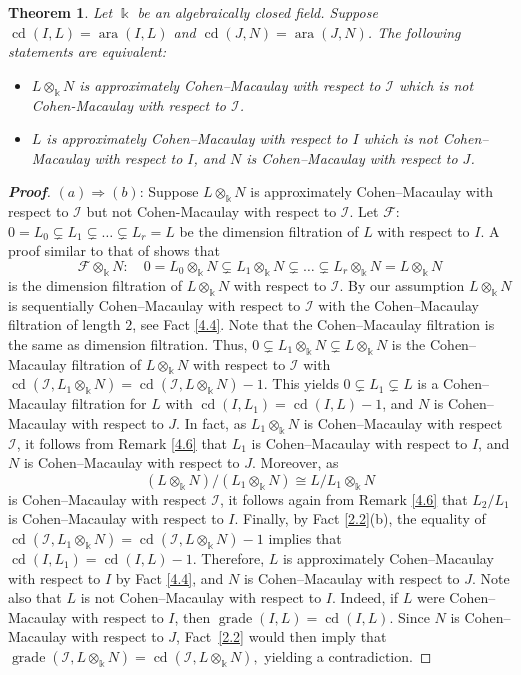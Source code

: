 \documentclass[10pt,a4paper]{amsart}
\newtheorem{theorem}{Theorem}[section]
\numberwithin{equation}{theorem}
\theoremstyle{definition}
\theoremstyle{fact}
\theoremstyle{conjecture}
\newcommand{\grade}{\operatorname{grade}}
\newcommand{\ara}{\operatorname{ara}}
\newcommand{\cd}{\operatorname{cd}}
\newenvironment{prf}[1][Proof]{\begin{proof}[\bf #1]}{\end{proof}}
\begin{document}
\begin{theorem}
\label{4.7}
Let $\Bbbk$ be an algebraically closed field. Suppose $\cd(I, L)=\ara(I, L)$ and $\cd(J, N)=\ara(J, N)$.
 The following statements are equivalent:
\begin{itemize}
\item[(a)] $L \otimes_\Bbbk N$ is approximately Cohen--Macaulay with respect to $\mathcal{I}$ which is not Cohen-Macaulay with respect to $\mathcal{I}$.
\item[(b)] $L$ is approximately Cohen--Macaulay with respect to $I$ which is not Cohen--Macaulay with respect to $I$, and $N$ is Cohen--Macaulay with respect to $J$.
\end{itemize}
\end{theorem}
\begin{prf}
\((a) \Rightarrow (b)\): Suppose $L\otimes_\Bbbk N$ is approximately Cohen--Macaulay with respect to $\mathcal{I}$ but not Cohen-Macaulay with respect to $\mathcal{I}$.
 Let  $\mathscr{F}$: $0=L_0\varsubsetneq L_1 \varsubsetneq \dots  \varsubsetneq L_r=L$
 be the dimension filtration of $L$ with respect to $I$. A proof similar to that of \cite[Lemma 4.5]{R4} shows that
\[
\mathscr{F}\otimes_{\Bbbk}N:\quad
0=L_0\otimes_{\Bbbk}N
\varsubsetneq L_1\otimes_{\Bbbk}N
\varsubsetneq \dots
\varsubsetneq L_r\otimes_{\Bbbk}N
=L\otimes_{\Bbbk}N
\]
is the dimension filtration of \(L\otimes_{\Bbbk}N\) with respect to \(\mathcal{I}\).
By our assumption $L\otimes_\Bbbk N$ is sequentially Cohen--Macaulay with respect to $\mathcal{I}$ with the Cohen--Macaulay filtration of length $2$, see Fact \ref{4.4}.
 Note that the Cohen--Macaulay filtration is the same as dimension filtration. Thus, $0 \subsetneq L_1\otimes_\Bbbk N \subsetneq L\otimes_\Bbbk N$ is
  the Cohen--Macaulay filtration of $L\otimes_\Bbbk N$ with respect to $\mathcal{I}$ with $\cd(\mathcal{I}, L_1\otimes_\Bbbk N)=\cd(\mathcal{I}, L\otimes_\Bbbk N)-1$.
   This yields $0 \subsetneq L_1 \subsetneq L$ is a Cohen--Macaulay filtration for $L$ with $\cd(I,  L_1)=\cd(I, L)-1$, and $N$ is Cohen--Macaulay with respect to $J$. In fact, as
   $L_1\otimes_\Bbbk N$ is Cohen--Macaulay with respect $\mathcal{I}$, it follows from Remark \ref{4.6} that $L_1$ is Cohen--Macaulay with respect to $I$, and $N$ is Cohen--Macaulay with respect to $J$. Moreover, as
   \[
(L\otimes_\Bbbk N)/(L_1\otimes_\Bbbk N)\cong L/L_1\otimes_\Bbbk N
\]
is Cohen--Macaulay with respect $\mathcal{I}$, it follows again from Remark \ref{4.6} that $L_2/L_1$ is Cohen--Macaulay with respect to $I$.
Finally, by Fact \ref{2.2}(b), the equality of $\cd(\mathcal{I}, L_1\otimes_\Bbbk N)=\cd(\mathcal{I}, L\otimes_\Bbbk N)-1$ implies that $\cd(I,  L_1)=\cd(I, L)-1$.
 Therefore, $L$ is approximately Cohen--Macaulay with respect to $I$ by Fact \ref{4.4}, and $N$ is Cohen--Macaulay with respect to $J$.
Note also that $L$ is not Cohen--Macaulay with respect to $I$. Indeed, if $L$ were Cohen--Macaulay with respect to $I$,
 then $\grade(I,L)=\cd(I,L)$. Since $N$ is Cohen--Macaulay with respect to $J$, Fact~\ref{2.2} would then imply that
$
\grade(\mathcal{I},L\otimes_{\Bbbk}N)
=\cd(\mathcal{I},L\otimes_{\Bbbk}N),
$
yielding a contradiction.



\end{prf}
\end{document}
